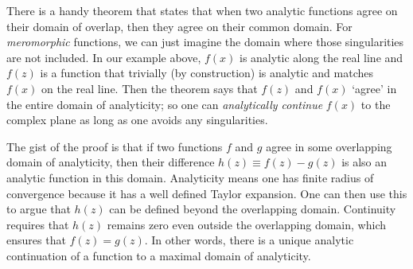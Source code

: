 There is a handy theorem that states that when two analytic functions agree on their domain of overlap, then they agree on their common domain. For \emph{meromorphic} functions, we can just imagine the domain where those singularities are not included. In our example above, $f(x)$ is analytic along the real line and $f(z)$ is a function that trivially (by construction) is analytic and matches $f(x)$ on the real line. Then the theorem says that $f(z)$ and $f(x)$ `agree' in the entire domain of analyticity; so one can \emph{analytically continue} $f(x)$ to the complex plane as long as one avoids any singularities.

The gist of the proof is that if two functions $f$ and  $g$ agree in some overlapping domain of analyticity, then their difference $h(z)\equiv f(z)-g(z)$ is also an analytic function in this domain. Analyticity means one has finite radius of convergence because it has a well defined Taylor expansion. One can then use this to argue that $h(z)$ can be defined beyond the overlapping domain. Continuity requires that $h(z)$ remains zero even outside the overlapping domain, which ensures that $f(z)=g(z)$. In other words, there is a unique analytic continuation of a function to a maximal domain of analyticity.

